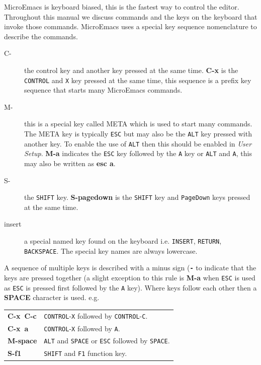 \documentclass[11pt,a4paper,pdftex]{article}
\begin{document}
  MicroEmacs is keyboard biased, this is the fastest way to control the
  editor. Throughout this manual we discuss commands and the keys on the
  keyboard that invoke those commands. MicroEmacs uses a special key sequence
  nomenclature to describe the commands.

  \begin{description}

    \item[C-] the control key and another key pressed at the same time.
    \textbf{C-x} is the \texttt{CONTROL} and \texttt{X} key pressed at the
    same time, this sequence is a prefix key sequence that starts many
    MicroEmacs commands.

    \item[M-] this is a special key called META which is used to start many
    commands. The META key is typically \texttt{ESC} but may also be the
    \texttt{ALT} key pressed with another key. To enable the use of
    \texttt{ALT} then this should be enabled in \textit{User Setup}.
    \textbf{M-a} indicates the \texttt{ESC} key followed by the \texttt{A} key
    or \texttt{ALT} and \texttt{A}, this may also be written as \textbf{esc
    a}.

    \item[S-] the \texttt{SHIFT} key. \textbf{S-pagedown} is the
    \texttt{SHIFT} key and \texttt{PageDown} keys pressed at the same time.

    \item[insert] a special named key found on the keyboard i.e.
    \texttt{INSERT}, \texttt{RETURN}, \texttt{BACKSPACE}. The special key
    names are always lowercase.

  \end{description}

  A sequence of multiple keys is described with a minus sign
  (\textbf{\texttt{-}} to indicate that the keys are pressed together (a
  slight exception to this rule is \textbf{M-a} when \texttt{ESC} is used as
  \texttt{ESC} is pressed first followed by the \texttt{A} key). Where keys
  follow each other then a \textbf{SPACE} character is used. e.g.

  \begin{longtable}{l@{\ --\ }l}
    \endhead
    \endfoot
    \endlastfoot
    \textbf{C-x~C-c} & \texttt{CONTROL}-\texttt{X} followed by
                       \texttt{CONTROL}-\texttt{C}.\\

    \textbf{C-x~a} & \texttt{CONTROL}-\texttt{X} followed by \texttt{A}.\\
    \textbf{M-space} & \texttt{ALT} and \texttt{SPACE} or \texttt{ESC} followed
                       by \texttt{SPACE}.\\
    \textbf{S-f1} & \texttt{SHIFT} and \texttt{F1} function key.\\
  \end{longtable}
\end{document}
